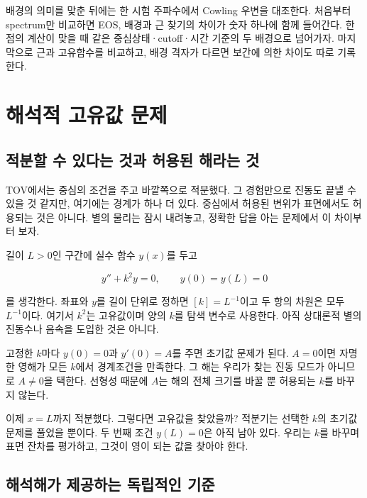\documentclass[
  10pt,
  a4paper,
]{article}
\begin{document}
배경의 의미를 맞춘 뒤에는 한 시험 주파수에서 Cowling 우변을 대조한다.
처음부터 spectrum만 비교하면 EOS, 배경과 근 찾기의 차이가 숫자 하나에
함께 들어간다. 한 점의 계산이 맞을 때 같은 중심상태·cutoff·시간 기준의
두 배경으로 넘어가자. 마지막으로 근과 고유함수를 비교하고, 배경 격자가
다르면 보간에 의한 차이도 따로 기록한다.


\section{해석적 고유값
문제}\label{uxd574uxc11duxc801-uxace0uxc720uxac12-uxbb38uxc81c}

\subsection{적분할 수 있다는 것과 허용된 해라는
것}\label{uxc801uxbd84uxd560-uxc218-uxc788uxb2e4uxb294-uxac83uxacfc-uxd5c8uxc6a9uxb41c-uxd574uxb77cuxb294-uxac83}

TOV에서는 중심의 조건을 주고 바깥쪽으로 적분했다. 그 경험만으로 진동도
끝낼 수 있을 것 같지만, 여기에는 경계가 하나 더 있다. 중심에서 허용된
변위가 표면에서도 허용되는 것은 아니다. 별의 물리는 잠시 내려놓고,
정확한 답을 아는 문제에서 이 차이부터 보자.

길이 \(L>0\)인 구간에 실수 함수 \(y(x)\)를 두고

\[
y''+k^2y=0,\qquad y(0)=y(L)=0
\]

를 생각한다. 좌표와 \(y\)를 길이 단위로 정하면 \([k]=L^{-1}\)이고 두
항의 차원은 모두 \(L^{-1}\)이다. 여기서 \(k^2\)는 고유값이며 양의
\(k\)를 탐색 변수로 사용한다. 아직 상대론적 별의 진동수나 음속을 도입한
것은 아니다.

고정한 \(k\)마다 \(y(0)=0\)과 \(y'(0)=A\)를 주면 초기값 문제가 된다.
\(A=0\)이면 자명한 영해가 모든 \(k\)에서 경계조건을 만족한다. 그 해는
우리가 찾는 진동 모드가 아니므로 \(A\ne0\)을 택한다. 선형성 때문에
\(A\)는 해의 전체 크기를 바꿀 뿐 허용되는 \(k\)를 바꾸지 않는다.

이제 \(x=L\)까지 적분했다. 그렇다면 고유값을 찾았을까? 적분기는 선택한
\(k\)의 초기값 문제를 풀었을 뿐이다. 두 번째 조건 \(y(L)=0\)은 아직 남아
있다. 우리는 \(k\)를 바꾸며 표면 잔차를 평가하고, 그것이 영이 되는 값을
찾아야 한다.

\subsection{해석해가 제공하는 독립적인
기준}\label{uxd574uxc11duxd574uxac00-uxc81cuxacf5uxd558uxb294-uxb3c5uxb9bduxc801uxc778-uxae30uxc900}
\end{document}
